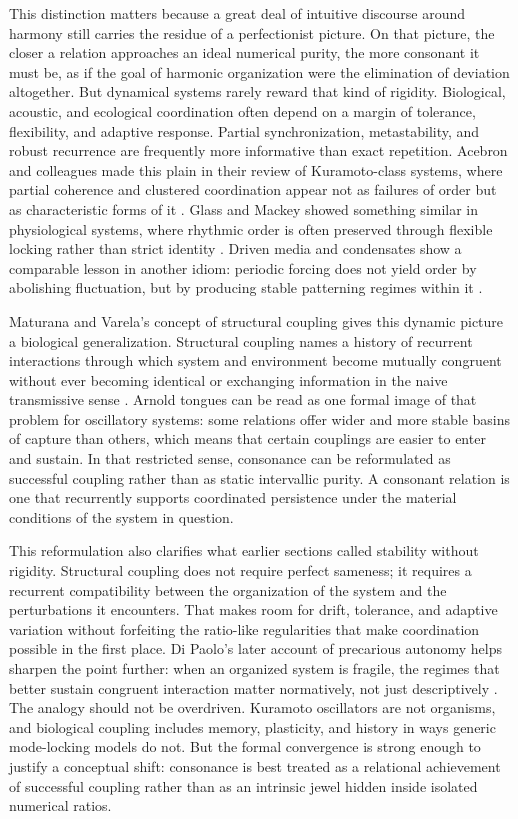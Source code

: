 This distinction matters because a great deal of intuitive discourse around harmony still carries the residue of a perfectionist picture. On that picture, the closer a relation approaches an ideal numerical purity, the more consonant it must be, as if the goal of harmonic organization were the elimination of deviation altogether. But dynamical systems rarely reward that kind of rigidity. Biological, acoustic, and ecological coordination often depend on a margin of tolerance, flexibility, and adaptive response. Partial synchronization, metastability, and robust recurrence are frequently more informative than exact repetition. Acebron and colleagues made this plain in their review of Kuramoto-class systems, where partial coherence and clustered coordination appear not as failures of order but as characteristic forms of it \parencite{acebron_2005}. Glass and Mackey showed something similar in physiological systems, where rhythmic order is often preserved through flexible locking rather than strict identity \parencite{glass_1988}. Driven media and condensates show a comparable lesson in another idiom: periodic forcing does not yield order by abolishing fluctuation, but by producing stable patterning regimes within it \parencite{engels_2007,nguyen_2019}.

Maturana and Varela's concept of structural coupling gives this dynamic picture a biological generalization. Structural coupling names a history of recurrent interactions through which system and environment become mutually congruent without ever becoming identical or exchanging information in the naive transmissive sense \parencite{maturana_varela_1980}. Arnold tongues can be read as one formal image of that problem for oscillatory systems: some relations offer wider and more stable basins of capture than others, which means that certain couplings are easier to enter and sustain. In that restricted sense, consonance can be reformulated as successful coupling rather than as static intervallic purity. A consonant relation is one that recurrently supports coordinated persistence under the material conditions of the system in question.

This reformulation also clarifies what earlier sections called stability without rigidity. Structural coupling does not require perfect sameness; it requires a recurrent compatibility between the organization of the system and the perturbations it encounters. That makes room for drift, tolerance, and adaptive variation without forfeiting the ratio-like regularities that make coordination possible in the first place. Di Paolo's later account of precarious autonomy helps sharpen the point further: when an organized system is fragile, the regimes that better sustain congruent interaction matter normatively, not just descriptively \parencite{dipaolo_2005}. The analogy should not be overdriven. Kuramoto oscillators are not organisms, and biological coupling includes memory, plasticity, and history in ways generic mode-locking models do not. But the formal convergence is strong enough to justify a conceptual shift: consonance is best treated as a relational achievement of successful coupling rather than as an intrinsic jewel hidden inside isolated numerical ratios.

